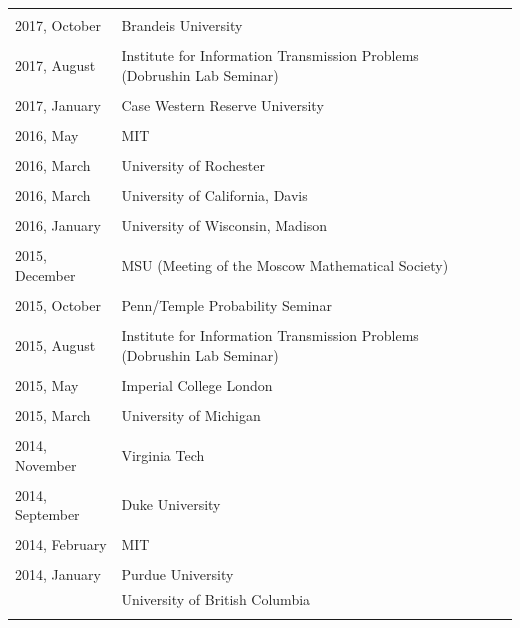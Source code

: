 \documentclass[letterpaper,11pt]{article}
\begin{document}
\begin{longtable}{llc}
	\\\\
	2017, October
	& Brandeis University
	\\\\
	2017, August
	& Institute for Information Transmission Problems
	(Dobrushin Lab Seminar)
	\\\\
	2017, January
	& Case Western Reserve University
	\\\\
	2016, May
	& MIT
	\\\\
	2016, March
	& University of Rochester
	\\\\
	2016, March
	& University of California, Davis
	\\\\
	2016, January
	& University of Wisconsin, Madison
	\\\\
	2015, December
	& MSU (Meeting of the Moscow Mathematical Society)
	\\\\
	2015, October
	& Penn/Temple Probability Seminar
	\\\\

	2015, August
	& Institute for Information Transmission Problems
	(Dobrushin Lab Seminar)
	\\\\

	2015, May
	& Imperial College London
	\\\\

	2015, March
	& University of Michigan
	\\\\

	2014, November
	& Virginia Tech\\\\

	2014, September
	& Duke University\\\\

	2014, February
	& MIT\\\\

	2014, January
	  & Purdue University & \hspace{110pt}
	\\& University of British Columbia \\\\


\end{longtable}
\end{document}
